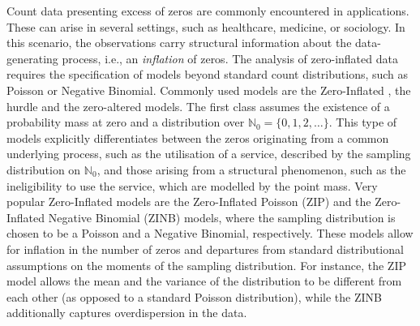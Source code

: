 \documentclass[11pt]{article}
\begin{document}
Count data presenting excess of zeros are commonly encountered in applications. These can arise in several settings, such as healthcare, medicine, or sociology. In this scenario, the observations carry structural information about the data-generating process, i.e., an \emph{inflation} of zeros.
The analysis of zero-inflated data requires the specification of models beyond standard count distributions, such as Poisson or Negative Binomial. Commonly used models are the Zero-Inflated \citep{lambert1992zero}, the hurdle \citep{mullahy1986specification} and the zero-altered \citep{heilbron1994zero} models. The first class assumes the existence of a probability mass at zero and a distribution over $\mathbb{N}_0 = \{0, 1, 2, \dots\}$. This type of models explicitly differentiates between the zeros originating from a common underlying process, such as the utilisation of a service, described by the sampling distribution on $\mathbb{N}_0$, and those arising from a structural phenomenon, such as the ineligibility to use the service, which are modelled by the point mass. 
Very popular Zero-Inflated models are the Zero-Inflated Poisson (ZIP) and the Zero-Inflated Negative Binomial (ZINB) models, where the sampling distribution is chosen to be a Poisson and a Negative Binomial, respectively. These models allow for inflation in the number of zeros and departures from standard distributional assumptions on the moments of the sampling distribution. For instance, the ZIP model allows the mean and the variance of the distribution to be different from each other (as opposed to a standard Poisson distribution), while the ZINB additionally captures overdispersion in the data.
\end{document}
